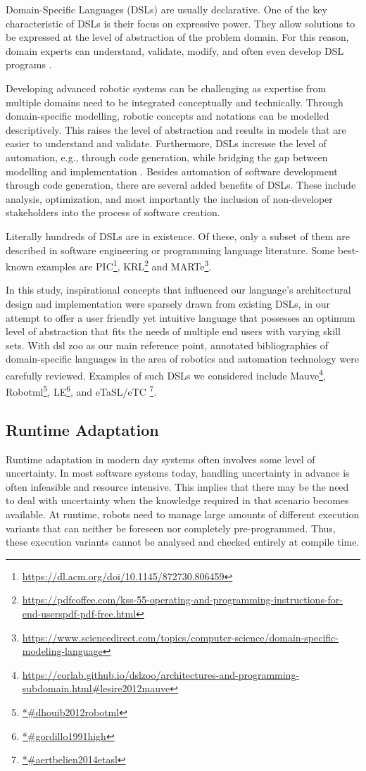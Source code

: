 \documentclass[conference]{IEEEtran}
\newcommand{\foot}[1]{\footnote{\url{#1}}}
\begin{document}
Domain-Specific Languages (DSLs) are usually declarative. One of the key characteristic of DSLs is their focus on expressive power. They allow solutions to be expressed at the level of abstraction of the problem domain. For this reason, domain experts can understand, validate, modify, and often even develop DSL programs \cite{dsl}.

Developing advanced robotic systems can be challenging as expertise from multiple domains need to be integrated conceptually and technically. Through domain-speciﬁc modelling, robotic concepts and notations can be modelled descriptively. This raises the level of abstraction and results in models that are easier to understand and validate. Furthermore, DSLs increase the level of automation, e.g., through code generation, while bridging the gap between modelling and implementation \cite{dsl-robo}. Besides automation of software development through code generation, there are several added benefits of DSLs. These include analysis, optimization, and most importantly the inclusion of non-developer stakeholders into the process of software creation.

Literally hundreds of DSLs are in existence. Of these, only a subset of them are described in software engineering or programming language literature. Some best-known examples are PIC\foot{https://dl.acm.org/doi/10.1145/872730.806459}, KRL\foot{https://pdfcoffee.com/kss-55-operating-and-programming-instructions-for-end-userspdf-pdf-free.html} and MARTe\foot{https://www.sciencedirect.com/topics/computer-science/domain-specific-modeling-language}.

In this study, inspirational concepts that influenced our language's architectural design and implementation were sparsely drawn from existing DSLs, in our attempt to offer a user friendly yet intuitive language that possesses an optimum level of abstraction that fits the needs of multiple end users with varying skill sets. With dsl zoo \cite{dsl-robo} as our main reference point, annotated bibliographies of domain-specific languages in the area of robotics and automation technology were carefully reviewed. Examples of such DSLs we considered include Mauve\foot{https://corlab.github.io/dslzoo/architectures-and-programming-subdomain.html#lesire2012mauve}, Robotml\foot{*#dhouib2012robotml}, LE\foot{*#gordillo1991high}, and eTaSL/eTC \foot{*#aertbelien2014etasl}.

\subsection{Runtime Adaptation}
Runtime adaptation in modern day systems often involves some level of uncertainty. In most software systems today, handling uncertainty in advance is often infeasible and resource intensive. This implies that there may be the need to deal with uncertainty when the knowledge required in that scenario becomes available. At runtime, robots need to manage large amounts of different execution variants that can neither be foreseen nor completely pre-programmed. Thus, these execution variants cannot be analysed and checked entirely at compile time.
\end{document}
